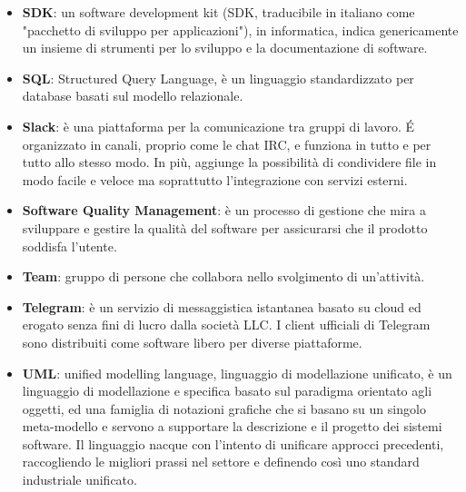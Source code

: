 \begin{itemize}
\item[] \textbf{SDK}: un software development kit (SDK, traducibile in italiano come "pacchetto di sviluppo per applicazioni"), in informatica, indica genericamente un insieme di strumenti per lo sviluppo e la documentazione di software.
\item[] \textbf{SQL}: Structured Query Language, è un linguaggio standardizzato per database basati sul modello relazionale.
\item[] \textbf{Slack}: è una piattaforma per la comunicazione tra gruppi di lavoro. \'E organizzato in canali, proprio come le chat IRC, e funziona in tutto e per tutto allo stesso modo. In più,  aggiunge la possibilità di condividere file in modo facile e veloce ma soprattutto l'integrazione con servizi esterni.
\item[] \textbf{Software Quality Management}: è un processo di gestione che mira a sviluppare e gestire la qualità del software per assicurarsi che il prodotto soddisfa l'utente.
\end{itemize}
\newpage

\begin{itemize}
\item[] \textbf{Team}: gruppo di persone che collabora nello svolgimento di un'attività.
\item[] \textbf{Telegram}: è un servizio di messaggistica istantanea basato su cloud ed erogato senza fini di lucro dalla società  LLC. I client ufficiali di Telegram sono distribuiti come software libero per diverse piattaforme.
\end{itemize}
\newpage

\begin{itemize}
\item[] \textbf{UML}: unified modelling language, linguaggio di modellazione unificato, è un linguaggio di modellazione e specifica basato sul paradigma orientato agli oggetti, ed una famiglia di notazioni grafiche che si basano su un singolo meta-modello e servono a supportare la descrizione e il progetto dei sistemi software. Il linguaggio nacque con l'intento di unificare approcci precedenti, raccogliendo le migliori prassi nel settore e definendo così uno standard industriale unificato.
\end{itemize}
\newpage

